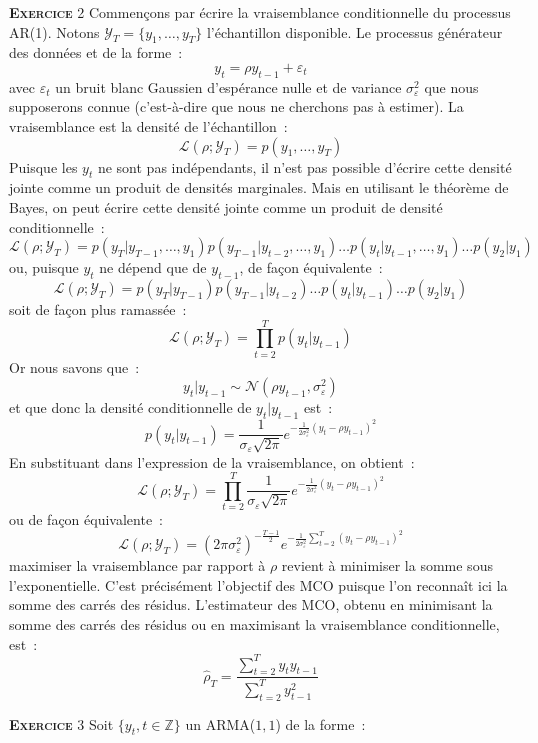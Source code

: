 \documentclass[10pt,a4paper,notitlepage,onecolumn]{article}
\newcommand{\exercice}[1]{\textsc{\textbf{Exercice}} #1}
\begin{document}
\exercice{2} Commençons par écrire  la vraisemblance conditionnelle du
processus   AR(1).   Notons   $\mathcal   Y_T   =   \{y_1,\dots,y_T\}$
l'échantillon disponible. Le processus générateur des données et de la forme :
\[
y_t = \rho y_{t-1}  + \varepsilon_t
\]
avec $\varepsilon_t$ un  bruit blanc Gaussien d'espérance  nulle et de
variance  $\sigma_{\varepsilon}^{2}$   que  nous   supposerons  connue
(c'est-à-dire que nous ne cherchons pas à estimer). La vraisemblance est la densité de l'échantillon :
\[
\mathcal L(\rho; \mathcal Y_T) = p(y_1,\dots,y_T)
\]
Puisque les $y_t$ ne sont pas indépendants, il n'est pas possible d'écrire cette densité jointe comme un produit de densités marginales. Mais en utilisant le théorème de Bayes, on peut écrire cette densité jointe comme un produit de densité conditionnelle :
\[
\mathcal L(\rho; \mathcal Y_T) = p(y_T|y_{T-1},\dots,y_{1})p(y_{T-1}|y_{t-2},\dots,y_{1})\dots p(y_{t}|y_{t-1},\dots,y_{1}) \dots p(y_2|y_1)
\]
ou, puisque $y_t$ ne dépend que de $y_{t-1}$, de façon équivalente :
\[
\mathcal L(\rho; \mathcal Y_T) = p(y_T|y_{T-1})p(y_{T-1}|y_{t-2})\dots p(y_{t}|y_{t-1})\dots p(y_2|y_1)
\]
soit de façon plus ramassée :
\[
\mathcal L(\rho; \mathcal Y_T) = \prod_{t=2}^T p(y_{t}|y_{t-1})
\]
Or nous savons que :
\[
y_t|y_{t-1} \sim \mathcal N \left(\rho y_{t-1},\sigma_{\varepsilon}^2\right)
\]
et que donc la densité conditionnelle de $y_t|y_{t-1}$ est :
\[
p(y_t|y_{t-1}) = \frac{1}{\sigma_{\varepsilon}\sqrt{2\pi}}e^{-\frac{1}{2\sigma_{\varepsilon}^2}\left(y_t-\rho y_{t-1}\right)^2}
\]
En substituant dans l'expression de la vraisemblance, on obtient :
\[
\mathcal L(\rho; \mathcal Y_T) = \prod_{t=2}^T\frac{1}{\sigma_{\varepsilon}\sqrt{2\pi}}e^{-\frac{1}{2\sigma_{\varepsilon}^2}\left(y_t-\rho y_{t-1}\right)^2}
\]
ou de façon équivalente :
\[
\mathcal L(\rho; \mathcal Y_T) = \left(2\pi\sigma_{\varepsilon}^2\right)^{-\frac{T-1}{2}}e^{-\frac{1}{2\sigma_{\varepsilon}^2}\sum_{t=2}^T\left(y_t-\rho y_{t-1}\right)^2}
\]
maximiser la vraisemblance par rapport à $\rho$ revient à minimiser la
somme  sous l'exponentielle.   C'est  précisément  l'objectif des  MCO
puisque    l'on   reconnaît    ici   la    somme   des    carrés   des
résidus.  L'estimateur des  MCO,  obtenu en  minimisant  la somme  des
carrés des  résidus ou en maximisant  la vraisemblance conditionnelle,
est :
\[
\hat \rho_T = \frac{\sum_{t=2}^T y_t y_{t-1}}{\sum_{t=2}^T y_{t-1}^2}
\] 

\bigskip
\bigskip

\exercice{3} Soit $\{y_t,t\in\mathbb Z\}$ un ARMA($1,1$) de la forme :
\end{document}
